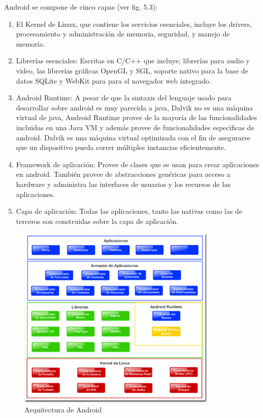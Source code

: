\documentclass[12pt,a4paper,spanish,openany]{book}
\begin{document}
Android se compone de cinco capas (ver fig. 5.3):
\begin{enumerate}
  \item El Kernel de Linux, que contiene los servicios
esenciales, incluye los drivers, procesamiento y administración de memoria,
seguridad, y manejo de memoria.
\item Librerías esenciales: Escritas en C/C++ que incluye; librerías para audio
y video, las librerías gráficas OpenGL y SGL, soporte nativo para la base
de datos SQLite y WebKit para para el navegador web integrado.
\item Android Runtime: A pesar de que la sintaxis del lenguaje usado para
desarrollar sobre android es muy parecida a java, Dalvik no es una máquina
virtual de java, Android Runtime provee de la mayoría de las funcionalidades incluidas en una Java VM y además provee de
funcionalidades especificas de android. Dalvik es una máquina virtual optimizada
con el fin de asegurarse que un dispositivo pueda correr múltiples instancias
eficientemente.
\item Framework de aplicación: Provee de clases que se usan para crear
aplicaciones en android. También provee de abstracciones genéricas para acceso a
hardware y administra las interfaces de usuarios y los recursos de las
aplicaciones.
\item Capa de aplicación: Todas las aplicaciones, tanto las nativas como las de
terceros son construidas sobre la capa de aplicación.
\end{enumerate}
 

\begin{figure}
\begin{center}
\includegraphics[width=0.85\textwidth]{./img/android-aplicaciones.jpg}
\caption{Arquitectura de Android}
\end{center}
\end{figure}
\end{document}
